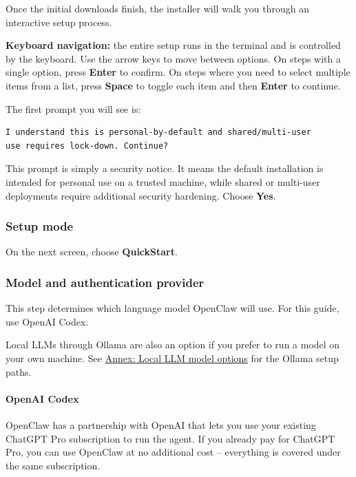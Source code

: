 \documentclass[12pt, a4paper]{article}
\begin{document}
Once the initial downloads finish, the installer will walk you through an interactive setup process.

\begin{notebox}
\textbf{Keyboard navigation:} the entire setup runs in the terminal and is controlled by the keyboard. Use the arrow keys to move between options. On steps with a single option, press \textbf{Enter} to confirm. On steps where you need to select multiple items from a list, press \textbf{Space} to toggle each item and then \textbf{Enter} to continue.
\end{notebox}

The first prompt you will see is:

\begin{lstlisting}[style=plainstyle]
I understand this is personal-by-default and shared/multi-user
use requires lock-down. Continue?
\end{lstlisting}

This prompt is simply a security notice. It means the default installation is intended for personal use on a trusted machine, while shared or multi-user deployments require additional security hardening. Choose \textbf{Yes}.

\subsubsection{Setup mode}

On the next screen, choose \textbf{QuickStart}.

\subsubsection{Model and authentication provider}

This step determines which language model OpenClaw will use. For this guide, use OpenAI Codex.

Local LLMs through Ollama are also an option if you prefer to run a model on your own machine. See \hyperref[annex:local-llms]{Annex: Local LLM model options} for the Ollama setup paths.

\paragraph{OpenAI Codex}

OpenClaw has a partnership with OpenAI that lets you use your existing ChatGPT Pro subscription to run the agent. If you already pay for ChatGPT Pro, you can use OpenClaw at no additional cost -- everything is covered under the same subscription.
\end{document}
